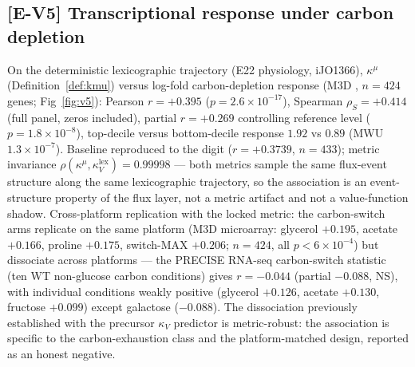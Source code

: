 \documentclass[11pt,a4paper]{article}
\theoremstyle{plain}
\theoremstyle{definition}
\theoremstyle{remark}
\newcommand{\kk}{\kappa_{\!V}}
\newcommand{\kmu}{\kappa^{\mu}}
\begin{document}
\subsection{[E-V5] Transcriptional response under carbon depletion}
On the deterministic lexicographic trajectory (E22 physiology, iJO1366),
$\kmu$ (Definition~\ref{def:kmu}) versus log-fold carbon-depletion
response (M3D \citep{faith2008}, $n = 424$ genes;
Fig~\ref{fig:v5}):
Pearson $r = +0.395$ ($p = 2.6 \times 10^{-17}$), Spearman
$\rho_S = +0.414$ (full panel, zeros included), partial $r = +0.269$
controlling reference level
($p = 1.8 \times 10^{-8}$), top-decile versus bottom-decile response
$1.92$ vs $0.89$ (MWU $1.3 \times 10^{-7}$). Baseline reproduced to the
digit ($r = +0.3739$, $n = 433$); metric invariance
$\rho(\kmu, \kk^{\mathrm{lex}}) = 0.99998$ --- both metrics sample the
same flux-event structure along the same lexicographic trajectory, so
the association is an event-structure property of the flux layer, not a
metric artifact and not a value-function shadow. Cross-platform
replication with the locked metric: the carbon-switch arms replicate
on the same platform (M3D microarray: glycerol $+0.195$, acetate
$+0.166$, proline $+0.175$, switch-MAX $+0.206$; $n = 424$, all
$p < 6 \times 10^{-4}$) but dissociate across platforms --- the
PRECISE RNA-seq carbon-switch statistic (ten WT non-glucose carbon
conditions) gives $r = -0.044$ (partial $-0.088$, NS), with
individual conditions weakly positive (glycerol $+0.126$, acetate
$+0.130$, fructose $+0.099$) except galactose ($-0.088$). The
dissociation previously established with the precursor $\kk$
predictor is metric-robust: the association is specific to the
carbon-exhaustion class and the platform-matched design, reported as
an honest negative.
\end{document}
